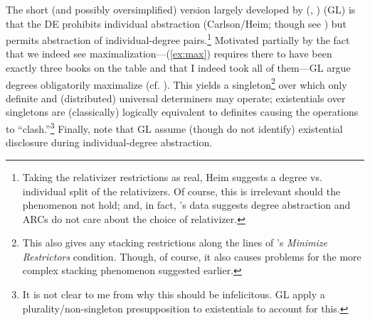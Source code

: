 \documentclass[11pt]{article}
\begin{document}
\begin{exe}
	\label{ex:arc}
	\label{ex:a-trc}
\end{exe}

The short (and possibly oversimplified) version largely developed by \citeauthor{grosuStrangeRelativesThird1998} (\citeyear{grosuStrangeRelativesThird1998}, \citeyear{grosuAmountRelatives2017}) (GL) is that the DE prohibits individual abstraction (Carlson/Heim; though see \cite{postalContrastingExtractionTypes1994}) but permits abstraction of individual-degree pairs.\footnote{Taking the relativizer restrictions as real, Heim suggests a degree vs. individual split of the relativizers. Of course, this is irrelevant should the phenomenon not hold; and, in fact, \citet{kayThatVsWhich}'s data suggests degree abstraction and ARCs do not care about the choice of relativizer.} Motivated partially by the fact that we indeed see maximalization---(\ref{ex:max}) requires there to have been exactly three books on the table and that I indeed took all of them---GL argue degrees obligatorily maximalize (cf. \cite{rullmannMaximalitySemanticsOfwhconstructions1995}). This yields a singleton\footnote{This also gives any stacking restrictions along the lines of \citet{schlenkerMinimizeRestrictorsNotes2005}'s \textit{Minimize Restrictors} condition. Though, of course, it also causes problems for the more complex stacking phenomenon suggested earlier.} over which only definite and (distributed) universal determiners may operate; existentials over singletons are (classically) logically equivalent to definites causing the operations to ``clash.''\footnote{It is not clear to me from \citet{grosuStrangeRelativesThird1998} why this should be infelicitous. GL apply a plurality/non-singleton presupposition to existentials to account for this.} Finally, note that GL assume (though do not identify) existential disclosure during individual-degree abstraction.

\begin{exe}
	\label{ex:max}
\end{exe}
\end{document}
